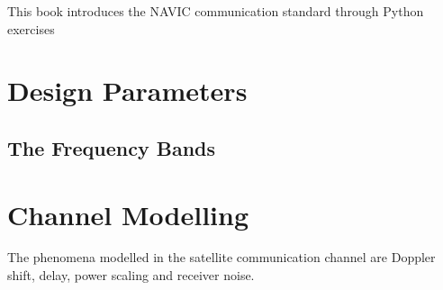 \documentclass[11pt]{book}
\begin{document}

\setcounter{page}{1}

\begin{introduction}
This book introduces the NAVIC communication standard through Python exercises

\end{introduction}

\mainmatter
\chapter{Design Parameters}
\section{The Frequency Bands}

\chapter{Channel Modelling}
The phenomena modelled in the satellite communication channel are Doppler shift, delay, power scaling and receiver noise.
\end{document}

